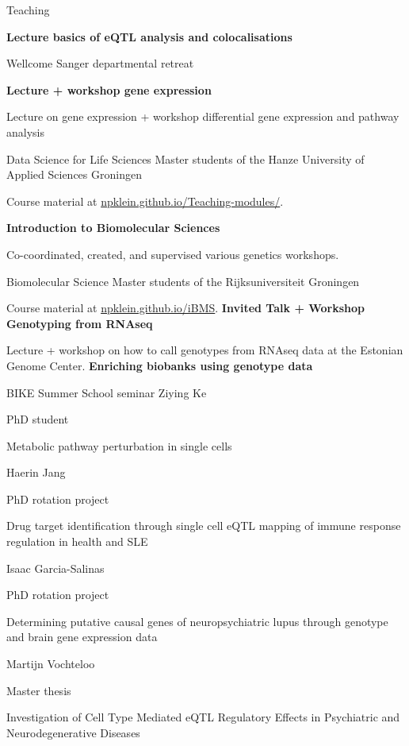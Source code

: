 \begin{rubric}{Teaching}
%
%

\entry*[16 Jun 2022]%
\textbf{Lecture basics of eQTL analysis and colocalisations} \par
Wellcome Sanger departmental retreat


\entry*[Sep 2019]%
\textbf{Lecture + workshop gene expression} \par
Lecture on gene expression + workshop differential gene expression and pathway analysis \par
Data Science for Life Sciences Master students of the Hanze University of Applied Sciences Groningen \par
Course material at \url{npklein.github.io/Teaching-modules/}.


%
	\textbf{Introduction to Biomolecular Sciences} \par
	 Co-coordinated, created, and supervised various genetics workshops. \par
	 Biomolecular Science Master students of the Rijksuniversiteit Groningen \par
	 Course material at \url{npklein.github.io/iBMS}.
%
\entry*[26 Aug 2016]%
\textbf{Invited Talk + Workshop Genotyping from RNAseq} \par
Lecture + workshop on how to call genotypes from RNAseq data at the Estonian Genome Center.
%
\entry*[22 Jun 2016]%
\textbf{Enriching biobanks using genotype data} \par
BIKE Summer School seminar
%
\entry*[Mar 2021 -- ]%
Ziying Ke \par
PhD student \par
Metabolic pathway perturbation in single cells

%
Haerin Jang \par
PhD rotation project \par
Drug target identification through single cell eQTL mapping of immune response regulation in health and SLE

%
Isaac Garcia-Salinas \par
PhD rotation project \par
Determining putative causal genes of neuropsychiatric lupus through genotype and brain gene expression data

%
Martijn Vochteloo \par
Master thesis \par
Investigation of Cell Type Mediated eQTL Regulatory Effects in Psychiatric and Neurodegenerative Diseases


\end{rubric}
